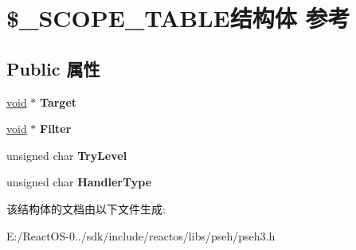 \hypertarget{struct_0B___s_c_o_p_e___t_a_b_l_e}{}\section{\$\+\_\+\+S\+C\+O\+P\+E\+\_\+\+T\+A\+B\+L\+E结构体 参考}
\label{struct_0B___s_c_o_p_e___t_a_b_l_e}
\subsection*{Public 属性}
\begin{DoxyCompactItemize}
\item 
\mbox{\label{struct_0B___s_c_o_p_e___t_a_b_l_e_a482c963281c256ed6eb22cf8045a7e31}} 
\hyperlink{interfacevoid}{void} $\ast$ {\bfseries Target}
\item 
\mbox{\label{struct_0B___s_c_o_p_e___t_a_b_l_e_a3ea0478596b76ad1d2cf40e40cab9718}} 
\hyperlink{interfacevoid}{void} $\ast$ {\bfseries Filter}
\item 
\mbox{\label{struct_0B___s_c_o_p_e___t_a_b_l_e_a0aa9064380e210b7ea9d7eeb08eaa4b2}} 
unsigned char {\bfseries Try\+Level}
\item 
\mbox{\label{struct_0B___s_c_o_p_e___t_a_b_l_e_a0ab27d67b0342c9bedf5884590fcada4}} 
unsigned char {\bfseries Handler\+Type}
\end{DoxyCompactItemize}


该结构体的文档由以下文件生成\+:\begin{DoxyCompactItemize}
\item 
E\+:/\+React\+O\+S-\/0../sdk/include/reactos/libs/pseh/pseh3.\+h\end{DoxyCompactItemize}
